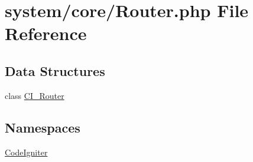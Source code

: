 \hypertarget{_router_8php}{}\section{system/core/\+Router.php File Reference}
\label{_router_8php}
\subsection*{Data Structures}
\begin{DoxyCompactItemize}
\item 
class \mbox{\hyperlink{class_c_i___router}{C\+I\+\_\+\+Router}}
\end{DoxyCompactItemize}
\subsection*{Namespaces}
\begin{DoxyCompactItemize}
\item 
 \mbox{\hyperlink{namespace_code_igniter}{Code\+Igniter}}
\end{DoxyCompactItemize}
